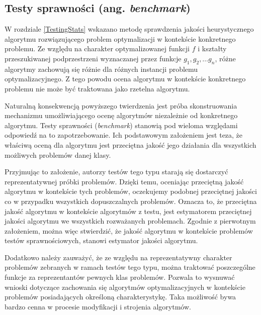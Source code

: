 \documentclass[12pt,a4paper]{report}
\begin{document}
{{{{{\subsection{Testy sprawności (ang. \emph{benchmark})}
\par{
W rozdziale \ref{TestingStats} wskazano metodę sprawdzenia jakości heurystycznego algorytmu rozwiązującego problem optymalizacji w kontekście konkretnego problemu. Ze względu na charakter optymalizowanej funkcji $f$ i kształty przeszukiwanej podprzestrzeni wyznaczanej przez funkcje $g_1,g_2, \ldots g_n$, różne algorytmy zachowują się różnie dla różnych instancji problemu optymalizacyjnego. Z tego powodu ocena algorytmu w kontekście konkretnego problemu nie może być traktowana jako rzetelna algorytmu.
}
\par{
Naturalną konsekwencją powyższego twierdzenia jest próba skonstruowania mechanizmu umożliwiającego ocenę algorytmów niezależnie od konkretnego algorytmu. Testy sprawności (\emph{benchmark}) stanowią pod wieloma względami odpowiedź na to zapotrzebowanie. Ich podstawowym założeniem jest teza, że właściwą oceną dla algorytmu jest przeciętna jakość jego działania dla wszystkich możliwych problemów danej klasy.
}
\par{
Przyjmując to założenie, autorzy testów tego typu starają się dostarczyć reprezentatywnej próbki problemów. Dzięki temu, oceniając przeciętną jakość algorytmu w kontekście tych problemów, oczekujemy podobnej przeciętnej jakości co w przypadku wszystkich dopuszczalnych problemów. Oznacza to, że przeciętna jakość algorytmu w kontekście algorytmów z testu, jest estymatorem przeciętnej jakości algorytmu we wszystkich rozważanych problemach. Zgodnie z pierwotnym założeniem, można więc stwierdzić, że jakość algorytmu w kontekście problemów testów sprawnościowych, stanowi estymator jakości algorytmu.
}
\par{
Dodatkowo należy zauważyć, że ze względu na reprezentatywny charakter problemów zebranych w ramach testów tego typu, można traktować poszczególne funkcje za reprezentantów pewnych klas problemów. Pozwala to wysnuwać wnioski dotyczące zachowania się algorytmów optymalizacyjnych w kontekście problemów posiadających określoną charakterystykę. Taka możliwość bywa bardzo cenna w procesie modyfikacji i strojenia algorytmów.
}
}}}}}
\end{document}
